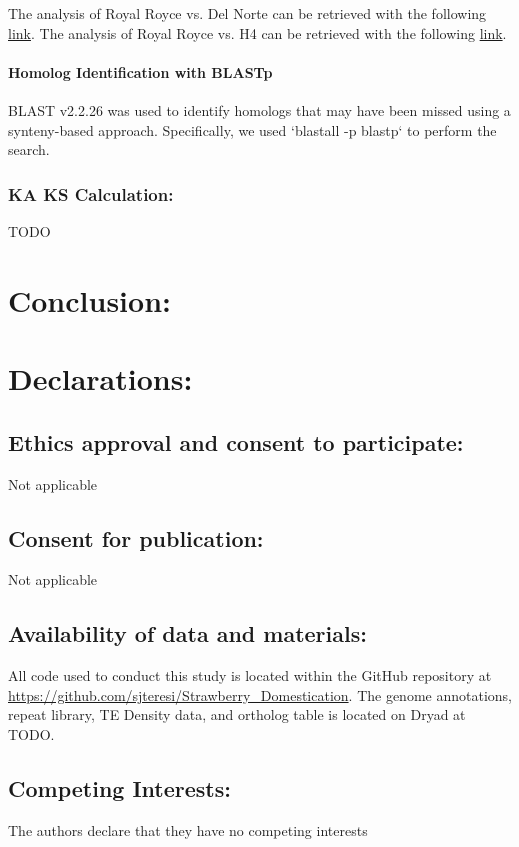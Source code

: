 \documentclass[fleqn,10pt]{olplainarticle}
\begin{document}
The analysis of Royal Royce vs. Del Norte can be retrieved with the following \href{ https://genomevolution.org/r/1r9uk}{link}.
The analysis of Royal Royce vs. H4 can be retrieved with the following \href{https://genomevolution.org/r/1r9uy}{link}.

\paragraph{Homolog Identification with BLASTp} \label{sec:methods_homologs}
BLAST v2.2.26 was used to identify homologs that may have been missed using a synteny-based approach.
Specifically, we used `blastall -p blastp` to perform the search. 

\subsubsection{KA KS Calculation:} \label{sec:ka_ks}
TODO

\section{Conclusion:}

\section{Declarations:}
\subsection{Ethics approval and consent to participate:}
Not applicable

\subsection{Consent for publication:}
Not applicable

\subsection{Availability of data and materials:}
All code used to conduct this study is located within the GitHub repository at \url{https://github.com/sjteresi/Strawberry_Domestication}.
The genome annotations, repeat library, TE Density data, and ortholog table is located on Dryad at TODO.

\subsection{Competing Interests:}
The authors declare that they have no competing interests
\end{document}
